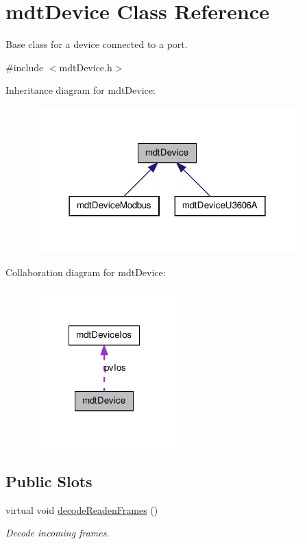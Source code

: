 \hypertarget{classmdt_device}{
\section{mdtDevice Class Reference}
\label{classmdt_device}
}


Base class for a device connected to a port.  




{\ttfamily \#include $<$mdtDevice.h$>$}



Inheritance diagram for mdtDevice:
\nopagebreak
\begin{figure}[H]
\begin{center}
\leavevmode
\includegraphics[width=294pt]{classmdt_device__inherit__graph}
\end{center}
\end{figure}


Collaboration diagram for mdtDevice:
\nopagebreak
\begin{figure}[H]
\begin{center}
\leavevmode
\includegraphics[width=156pt]{classmdt_device__coll__graph}
\end{center}
\end{figure}
\subsection*{Public Slots}
\begin{DoxyCompactItemize}
\item 
virtual void \hyperlink{classmdt_device_a0e43cc312b5b0685b07da8a49dd1ede6}{decodeReadenFrames} ()
\begin{DoxyCompactList}\small\item\em Decode incoming frames. \end{DoxyCompactList}\end{DoxyCompactItemize}
